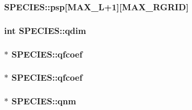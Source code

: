 \hypertarget{struct_s_p_e_c_i_e_s_a938ca2ebdb8003befdab28b1796abe81}{
\subsubsection[{psp}]{ S\-P\-E\-C\-I\-E\-S\-::psp\mbox{[}{\bf M\-A\-X\-\_\-\-L}+1\mbox{]}\mbox{[}{\bf M\-A\-X\-\_\-\-R\-G\-R\-I\-D}\mbox{]}}}\label{struct_s_p_e_c_i_e_s_a938ca2ebdb8003befdab28b1796abe81}
\hypertarget{struct_s_p_e_c_i_e_s_a51d948338eca077d974124750e3de313}{
\subsubsection[{qdim}]{\setlength{\rightskip}{0pt plus 5cm}int S\-P\-E\-C\-I\-E\-S\-::qdim}}\label{struct_s_p_e_c_i_e_s_a51d948338eca077d974124750e3de313}
\hypertarget{struct_s_p_e_c_i_e_s_a876afa06201024560b8654e0e9a3de5b}{
\subsubsection[{qfcoef}]{ $\ast$ S\-P\-E\-C\-I\-E\-S\-::qfcoef}}\label{struct_s_p_e_c_i_e_s_a876afa06201024560b8654e0e9a3de5b}
\hypertarget{struct_s_p_e_c_i_e_s_a3ae6d20d4a8fd84f4a9ae0437c7b3fc5}{
\subsubsection[{qfcoef}]{$\ast$ S\-P\-E\-C\-I\-E\-S\-::qfcoef}}\label{struct_s_p_e_c_i_e_s_a3ae6d20d4a8fd84f4a9ae0437c7b3fc5}
\hypertarget{struct_s_p_e_c_i_e_s_a04863d59e8307c0af2bc72908a061b1c}{
\subsubsection[{qnm}]{ $\ast$ S\-P\-E\-C\-I\-E\-S\-::qnm}}\label{struct_s_p_e_c_i_e_s_a04863d59e8307c0af2bc72908a061b1c}

